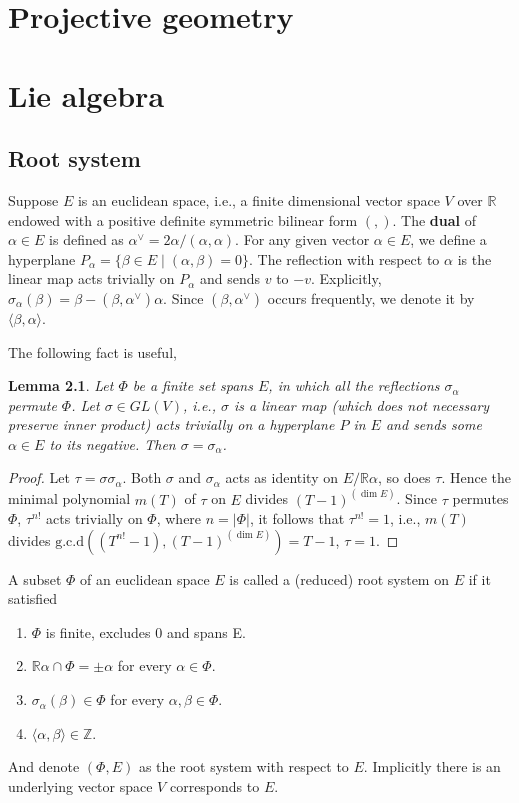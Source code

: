 \documentclass{amsbook}
\newtheorem{lemma}[theorem]{Lemma}
\theoremstyle{definition}
\theoremstyle{remark}
\newcommand{\Z}{\mathbb{Z}}
\newcommand{\R}{\mathbb{R}}
\newcommand{\cartan}[2]{\langle {#1}, {#2} \rangle}
\numberwithin{section}{chapter}
\numberwithin{equation}{chapter}
\begin{document}
\chapter{Projective geometry}

\chapter{Lie algebra}


\section{Root system}
Suppose $E$ is an euclidean space, i.e., a finite dimensional vector space $V$ over $\R$ endowed with a positive definite symmetric bilinear form $(,)$. The \textbf{dual} of $\alpha\in E$ is defined as $\alpha^\vee = 2\alpha/(\alpha, \alpha)$. For any given vector $\alpha\in E$, we define a hyperplane $P_\alpha = \{\beta\in E \mid (\alpha, \beta) = 0\}$. The reflection with respect to $\alpha$ is the linear map acts trivially on $P_\alpha$ and sends $v$ to $-v$. Explicitly, $\sigma_\alpha(\beta) = \beta - (\beta, \alpha^\vee)\alpha$. Since $(\beta, \alpha^\vee)$ occurs frequently, we denote it by $\cartan{\beta}{\alpha}$. 

The following fact is useful,

\begin{lemma}{\label{sdf}}
	Let $\Phi$ be a finite set spans $E$, in which all the reflections $\sigma_\alpha$ permute $\Phi$. Let $\sigma \in GL(V)$, i.e., $\sigma$ is a linear map (which does not necessary preserve inner product) acts trivially on a hyperplane $P$ in $E$ and sends some $\alpha\in E$ to its negative. Then $\sigma = \sigma_\alpha$.
\end{lemma}
\begin{proof}
	Let $\tau = \sigma\sigma_\alpha$. Both $\sigma$ and $\sigma_\alpha$ acts as identity on $E/\R\alpha$, so does $\tau$. Hence the minimal polynomial $m(T)$ of $\tau$ on $E$ divides $(T - 1)^{(\dim E)}$. Since $\tau$ permutes $\Phi$, $\tau^{n!}$ acts trivially on $\Phi$, where $n = |\Phi|$, it follows that $\tau^{n!} = 1$, i.e., $m(T)$ divides $\text{g.c.d}((T^{n!} - 1), (T - 1)^{(\dim E)}) = T - 1$, $\tau = 1$.
\end{proof}

A subset $\Phi$ of an euclidean space $E$ is called a (reduced) root system on $E$ if it satisfied
\begin{enumerate}
	\item $\Phi$ is finite, excludes 0 and spans E.
	\item $\R\alpha \cap \Phi = {\pm \alpha}$ for every $\alpha \in \Phi$.
	\item $\sigma_{\alpha}(\beta) \in \Phi$ for every $\alpha, \beta \in \Phi$.
	\item $\cartan{\alpha}{\beta} \in \Z$.  
\end{enumerate}
And denote $(\Phi, E)$ as the root system with respect to $E$. Implicitly there is an underlying vector space $V$ corresponds to $E$.
\end{document}
